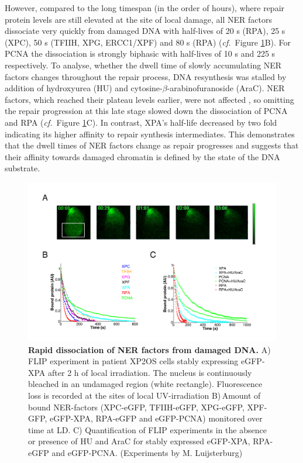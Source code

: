 However, compared to the long timespan (in the order of hours), where repair protein levels are still elevated at the site of local damage, all NER factors dissociate very quickly from damaged DNA with half-lives of 20 s (RPA), 25 s (XPC), 50 s (TFIIH, XPG, ERCC1/XPF) and 80 s (RPA) (\textit{cf.}\ Figure \ref{fig:accuFlip}B). For PCNA the dissociation is strongly biphasic with half-lives of 10 s and 225 s respectively. To analyse, whether the dwell time of slowly accumulating NER factors changes throughout the repair process, DNA resynthesis was stalled by addition of hydroxyurea (HU) and cytosine-$\beta$-arabinofuranoside (AraC). NER factors, which reached their plateau levels earlier, were not affected \cite{Luijsterburg2010}, so omitting the repair progression at this late stage slowed down the dissociation of PCNA and RPA (\textit{cf.}\ Figure \ref{fig:accuFlip}C). In contrast, XPA's half-life decreased by two fold indicating its higher affinity to repair synthesis intermediates. This demonstrates that the dwell times of NER factors change as repair progresses and suggests that their affinity towards damaged chromatin is defined by the state of the DNA substrate.      
 \label{sec:FLIP}          
  \begin{figure}[t]
  	\begin{center}
  		\includegraphics[width=1\textwidth]{Abbildungen/figure2_2_2.pdf}
  		\caption{\textbf{Rapid dissociation of NER factors from damaged DNA.} A) FLIP experiment in patient XP2OS cells stably expressing eGFP-XPA after 2 h of local irradiation. The nucleus is continuously bleached in an undamaged region (white rectangle). Fluorescence loss is recorded at the sites of local UV-irradiation B)\,Amount of bound NER-factors (XPC-eGFP, TFIIH-eGFP, XPG-eGFP, XPF-GFP, eGFP-XPA, RPA-eGFP and eGFP-PCNA) monitored over time at LD. C) Quantification of FLIP experiments in the absence or presence of HU and AraC for stably expressed eGFP-XPA, RPA-eGFP and eGFP-PCNA. (Experiments by M. Luijsterburg)}
  		\label{fig:accuFlip}
  	\end{center}
  \end{figure}



